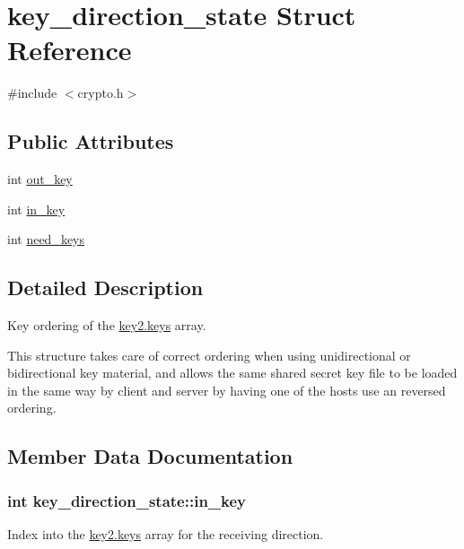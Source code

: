 \hypertarget{structkey__direction__state}{}\section{key\+\_\+direction\+\_\+state Struct Reference}
\label{structkey__direction__state}


{\ttfamily \#include $<$crypto.\+h$>$}

\subsection*{Public Attributes}
\begin{DoxyCompactItemize}
\item 
int \hyperlink{structkey__direction__state_acedd040b7d56fae540d55e6a380b42bb}{out\+\_\+key}
\item 
int \hyperlink{structkey__direction__state_a650262f702aa180805a0101bbcb7646b}{in\+\_\+key}
\item 
int \hyperlink{structkey__direction__state_a235ef043e0135e9626b532d28c6a5ddc}{need\+\_\+keys}
\end{DoxyCompactItemize}


\subsection{Detailed Description}
Key ordering of the {\ttfamily \hyperlink{structkey2_a9698a633f0112a2000a0efdb8d960010}{key2.\+keys}} array.

This structure takes care of correct ordering when using unidirectional or bidirectional key material, and allows the same shared secret key file to be loaded in the same way by client and server by having one of the hosts use an reversed ordering. 

\subsection{Member Data Documentation}
\hypertarget{structkey__direction__state_a650262f702aa180805a0101bbcb7646b}{}
\subsubsection[{in\+\_\+key}]{\setlength{\rightskip}{0pt plus 5cm}int key\+\_\+direction\+\_\+state\+::in\+\_\+key}\label{structkey__direction__state_a650262f702aa180805a0101bbcb7646b}
Index into the {\ttfamily \hyperlink{structkey2_a9698a633f0112a2000a0efdb8d960010}{key2.\+keys}} array for the receiving direction. \hypertarget{structkey__direction__state_a235ef043e0135e9626b532d28c6a5ddc}{}

